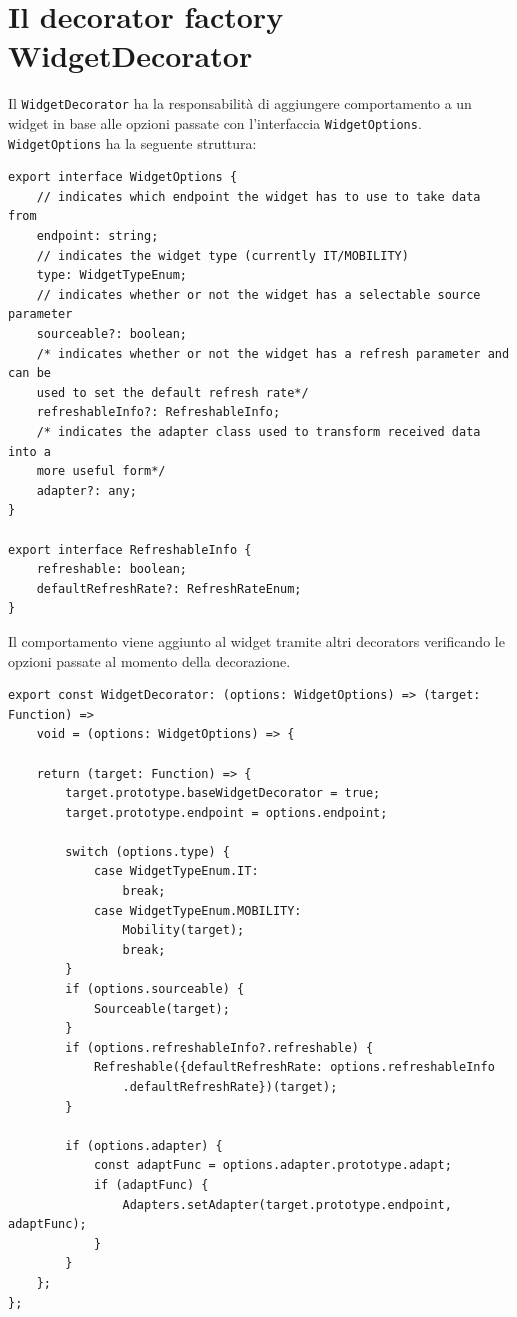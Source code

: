 \section{Il decorator factory WidgetDecorator}
Il \verb|WidgetDecorator| ha la responsabilità di aggiungere comportamento a un widget in base alle opzioni passate con l'interfaccia \verb|WidgetOptions|.\\
\verb|WidgetOptions| ha la seguente struttura:\\
\begin{lstlisting}[caption={Struttura delle WidgetOptions e delle RefreshableInfo}, style=javaScriptCode]
export interface WidgetOptions {
    // indicates which endpoint the widget has to use to take data from
    endpoint: string;
    // indicates the widget type (currently IT/MOBILITY)
    type: WidgetTypeEnum;
    // indicates whether or not the widget has a selectable source parameter
    sourceable?: boolean;
    /* indicates whether or not the widget has a refresh parameter and can be 
    used to set the default refresh rate*/
    refreshableInfo?: RefreshableInfo; 
    /* indicates the adapter class used to transform received data into a 
    more useful form*/
    adapter?: any;
}

export interface RefreshableInfo {
    refreshable: boolean;
    defaultRefreshRate?: RefreshRateEnum;
}
\end{lstlisting}
Il comportamento viene aggiunto al widget tramite altri decorators verificando le opzioni passate al momento della decorazione.\\
\begin{lstlisting}[caption={Decorator factory WidgetDecorator}, style=javaScriptCode]
export const WidgetDecorator: (options: WidgetOptions) => (target: Function) => 
    void = (options: WidgetOptions) => {

    return (target: Function) => {
        target.prototype.baseWidgetDecorator = true;
        target.prototype.endpoint = options.endpoint;

        switch (options.type) {
            case WidgetTypeEnum.IT:
                break;
            case WidgetTypeEnum.MOBILITY:
                Mobility(target);
                break;
        }
        if (options.sourceable) {
            Sourceable(target);
        }
        if (options.refreshableInfo?.refreshable) {
            Refreshable({defaultRefreshRate: options.refreshableInfo
                .defaultRefreshRate})(target);
        }

        if (options.adapter) {
            const adaptFunc = options.adapter.prototype.adapt;
            if (adaptFunc) {
                Adapters.setAdapter(target.prototype.endpoint, adaptFunc);
            }
        }
    };
};
\end{lstlisting}
